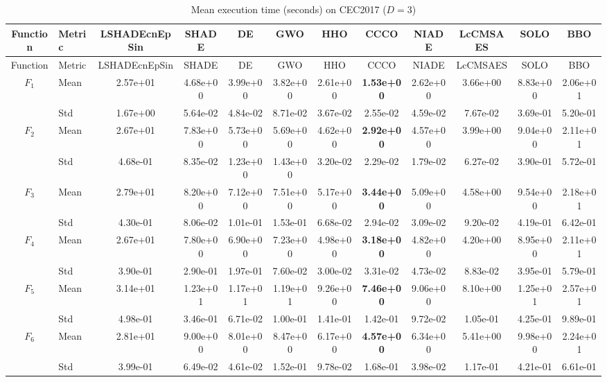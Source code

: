 \begin{center}
\small
\renewcommand{\arraystretch}{1.25}
\begin{longtable}{clcccccccccc}
\caption{Mean execution time (seconds) on CEC2017 ($D=3$) }
\label{tab:time_CEC2017_3} \\
\toprule
Function & Metric & LSHADEcnEpSin & SHADE & DE & GWO & HHO & CCCO & NIADE & LcCMSAES & SOLO & BBO \\
\midrule
\endfirsthead
\toprule
Function & Metric & LSHADEcnEpSin & SHADE & DE & GWO & HHO & CCCO & NIADE & LcCMSAES & SOLO & BBO \\
\midrule
\endhead
$F_{1}$ & Mean & 2.57e+01 & 4.68e+00 & 3.99e+00 & 3.82e+00 & 2.61e+00 & \textbf{1.53e+00} & 2.62e+00 & 3.66e+00 & 8.83e+00 & 2.06e+01 \\
 & Std & 1.67e+00 & 5.64e-02 & 4.84e-02 & 8.71e-02 & 3.67e-02 & 2.55e-02 & 4.59e-02 & 7.67e-02 & 3.69e-01 & 5.20e-01 \\
\midrule
$F_{2}$ & Mean & 2.67e+01 & 7.83e+00 & 5.73e+00 & 5.69e+00 & 4.62e+00 & \textbf{2.92e+00} & 4.57e+00 & 3.99e+00 & 9.04e+00 & 2.11e+01 \\
 & Std & 4.68e-01 & 8.35e-02 & 1.23e+00 & 1.43e+00 & 3.20e-02 & 2.29e-02 & 1.79e-02 & 6.27e-02 & 3.90e-01 & 5.72e-01 \\
\midrule
$F_{3}$ & Mean & 2.79e+01 & 8.20e+00 & 7.12e+00 & 7.51e+00 & 5.17e+00 & \textbf{3.44e+00} & 5.09e+00 & 4.58e+00 & 9.54e+00 & 2.18e+01 \\
 & Std & 4.30e-01 & 8.06e-02 & 1.01e-01 & 1.53e-01 & 6.68e-02 & 2.94e-02 & 3.09e-02 & 9.20e-02 & 4.19e-01 & 6.42e-01 \\
\midrule
$F_{4}$ & Mean & 2.67e+01 & 7.80e+00 & 6.90e+00 & 7.23e+00 & 4.98e+00 & \textbf{3.18e+00} & 4.82e+00 & 4.20e+00 & 8.95e+00 & 2.11e+01 \\
 & Std & 3.90e-01 & 2.90e-01 & 1.97e-01 & 7.60e-02 & 3.00e-02 & 3.31e-02 & 4.73e-02 & 8.83e-02 & 3.95e-01 & 5.79e-01 \\
\midrule
$F_{5}$ & Mean & 3.14e+01 & 1.23e+01 & 1.17e+01 & 1.19e+01 & 9.26e+00 & \textbf{7.46e+00} & 9.06e+00 & 8.10e+00 & 1.25e+01 & 2.57e+01 \\
 & Std & 4.98e-01 & 3.46e-01 & 6.71e-02 & 1.00e-01 & 1.41e-01 & 1.42e-01 & 9.72e-02 & 1.05e-01 & 4.25e-01 & 9.89e-01 \\
\midrule
$F_{6}$ & Mean & 2.81e+01 & 9.00e+00 & 8.01e+00 & 8.47e+00 & 6.17e+00 & \textbf{4.57e+00} & 6.34e+00 & 5.41e+00 & 9.98e+00 & 2.24e+01 \\
 & Std & 3.99e-01 & 6.49e-02 & 4.61e-02 & 1.52e-01 & 9.78e-02 & 1.68e-01 & 3.98e-02 & 1.17e-01 & 4.21e-01 & 6.61e-01 \\

\end{longtable}
\end{center}
